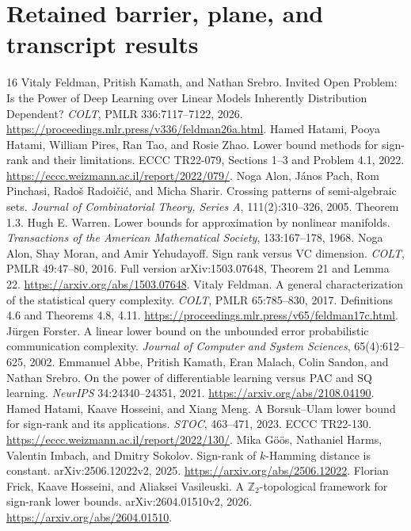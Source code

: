 \documentclass[11pt]{article}
\newcommand{\1}{\mathbf 1}
\begin{document}
\section{Retained barrier, plane, and transcript results}\label{sec:retained}
\setcounter{theorem}{0}

\begin{thebibliography}{16}
 Vitaly Feldman, Pritish Kamath, and Nathan Srebro. Invited Open Problem: Is the Power of Deep Learning over Linear Models Inherently Distribution Dependent? \emph{COLT}, PMLR 336:7117--7122, 2026. \url{https://proceedings.mlr.press/v336/feldman26a.html}.
 Hamed Hatami, Pooya Hatami, William Pires, Ran Tao, and Rosie Zhao. Lower bound methods for sign-rank and their limitations. ECCC TR22-079, Sections 1--3 and Problem 4.1, 2022. \url{https://eccc.weizmann.ac.il/report/2022/079/}.
 Noga Alon, J\'anos Pach, Rom Pinchasi, Rado\v{s} Radoi\v{c}i\'c, and Micha Sharir. Crossing patterns of semi-algebraic sets. \emph{Journal of Combinatorial Theory, Series A}, 111(2):310--326, 2005. Theorem 1.3.
 Hugh E. Warren. Lower bounds for approximation by nonlinear manifolds. \emph{Transactions of the American Mathematical Society}, 133:167--178, 1968.
 Noga Alon, Shay Moran, and Amir Yehudayoff. Sign rank versus VC dimension. \emph{COLT}, PMLR 49:47--80, 2016. Full version arXiv:1503.07648, Theorem 21 and Lemma 22. \url{https://arxiv.org/abs/1503.07648}.
 Vitaly Feldman. A general characterization of the statistical query complexity. \emph{COLT}, PMLR 65:785--830, 2017. Definitions 4.6 and Theorems 4.8, 4.11. \url{https://proceedings.mlr.press/v65/feldman17c.html}.
 J\"urgen Forster. A linear lower bound on the unbounded error probabilistic communication complexity. \emph{Journal of Computer and System Sciences}, 65(4):612--625, 2002.
 Emmanuel Abbe, Pritish Kamath, Eran Malach, Colin Sandon, and Nathan Srebro. On the power of differentiable learning versus PAC and SQ learning. \emph{NeurIPS} 34:24340--24351, 2021. \url{https://arxiv.org/abs/2108.04190}.
 Hamed Hatami, Kaave Hosseini, and Xiang Meng. A Borsuk--Ulam lower bound for sign-rank and its applications. \emph{STOC}, 463--471, 2023. ECCC TR22-130. \url{https://eccc.weizmann.ac.il/report/2022/130/}.
 Mika G\"o\"os, Nathaniel Harms, Valentin Imbach, and Dmitry Sokolov. Sign-rank of $k$-Hamming distance is constant. arXiv:2506.12022v2, 2025. \url{https://arxiv.org/abs/2506.12022}.
 Florian Frick, Kaave Hosseini, and Aliaksei Vasileuski. A $\mathbb Z_2$-topological framework for sign-rank lower bounds. arXiv:2604.01510v2, 2026. \url{https://arxiv.org/abs/2604.01510}.


\end{thebibliography}
\end{document}
